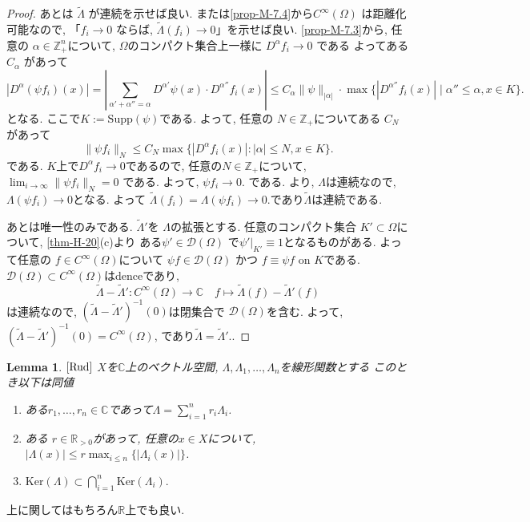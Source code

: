 \documentclass[dvipdfmx,a4paper,11pt]{article} %
\newtheorem{lem}[thm]{Lemma}
\theoremstyle{definition}
\theoremstyle{remark}
\numberwithin{equation}{section}
\newcommand{\Ker}[1]{\mathrm{Ker}(#1)}
\newcommand{\R}{\mathbb{R}}
\newcommand{\N}{\mathbb{Z}_+}
\begin{document}
\begin{proof}
あとは \(\tilde{\Lambda}\) が連続を示せば良い. 
 \cite[Thm 1.32]{Rud}または\ref{prop-M-7.4}から\(C^\infty(\Omega)\) は距離化可能なので, 
「\(f_i \to 0\) ならば,  \(\tilde{\Lambda}(f_i) \to 0\)」を示せば良い. 
\ref{prop-M-7.3}から, 任意の \(\alpha \in \N^n\)について, \(\Omega\)のコンパクト集合上一様に \(D^\alpha f_i \to 0\) である
よってある \(C_\alpha\) があって
\[
|D^\alpha(\psi f_i)(x)| = 
|\sum_{\alpha'+\alpha''=\alpha} D^{\alpha'}\psi(x)\cdot D^{\alpha''}f_i(x)| 
\le C_\alpha \|\psi\|_{|\alpha|} \cdot \max\{|D^{\alpha''}f_i(x)| \mid \alpha''\le \alpha, x\in K\}.
\]
となる. ここで$K:= \mathrm{Supp}(\psi)$である.
よって, 任意の \( N \in \N\)についてある \( C_N\) があって
\[
\|\psi f_i\|_N \le 
C_N \max \{ |D^\alpha f_i(x)| : |\alpha|\le N, x \in K\}.
\]
である. \(K\)上で\(D^\alpha f_i \to 0\)であるので, 
任意の$N \in \N$について, \(\lim_{i \to \infty} \|\psi f_i\|_N = 0\) である.
よって, 
\(\psi f_i \to 0.\) である.  \cite[Thm 6.6]{Rud}より, $\Lambda$は連続なので, 
\(\Lambda(\psi f_i) \to 0\)となる. 
よって
\( \tilde{\Lambda}(f_i) = \Lambda(\psi f_i) \to 0.\)であり\(\tilde{\Lambda}\)は連続である.


あとは唯一性のみである. 
\(\tilde{\Lambda}'\)を \(\Lambda\)の拡張とする. 
任意のコンパクト集合 \( K' \subset \Omega\)について, \ref{thm-H-20}(c)より
 ある\( \psi' \in \mathcal{D}(\Omega)\) で\(\psi'|_{K'} \equiv 1\)となるものがある. 
よって任意の \(f \in C^\infty(\Omega)\)について
\(\psi f \in \mathcal{D}(\Omega)\) かつ \(f \equiv \psi f\) on \(K\)である. 
 \(\mathcal{D}(\Omega) \subset C^\infty(\Omega)\)はdenceであり, 
\[
\tilde{\Lambda} - \tilde{\Lambda}': C^\infty(\Omega) \to \mathbb{C}
\quad
f \mapsto \tilde{\Lambda}(f) - \tilde{\Lambda}'(f)
\]は連続なので, 
\((\tilde{\Lambda}-\tilde{\Lambda}')^{-1}(0)\)は閉集合で \(\mathcal{D}(\Omega)\)を含む.
よって, \( (\tilde{\Lambda}-\tilde{\Lambda}')^{-1}(0) = C^\infty(\Omega)\), であり\(\tilde{\Lambda} = \tilde{\Lambda}'.\).  
\end{proof}



\begin{tcolorbox}[mybox]
\begin{lem}{$\cite[Lem 3.9]{Rud}$}
\label{lem-H-2.1}
\(X\)を\(\mathbb{C}\)上のベクトル空間, 
\(\Lambda, \Lambda_1, \dots, \Lambda_n\)を線形関数とする
このとき以下は同値
\begin{enumerate}
\item ある\(r_1,\dots,r_n \in \mathbb{C}\)であって\(\Lambda = \sum_{i=1}^n r_i \Lambda_i\).  
\item ある \(r \in \mathbb{R}_{>0}\)があって, 任意の$x \in X$について, \(|\Lambda(x)| \le r \max_{i \le n} \{|\Lambda_i(x)|\}\).
\item  \(\Ker{\Lambda} \subset \bigcap_{i=1}^n \Ker{\Lambda_i}.\)  
\end{enumerate}
\end{lem}
\end{tcolorbox}
上に関してはもちろん$\R$上でも良い.
\end{document}
